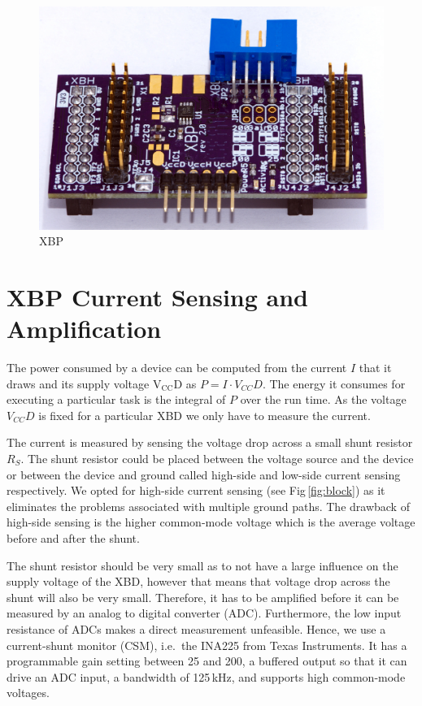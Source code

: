 \documentclass[twoside,11pt]{cergdoc}
\begin{document}
\begin{figure}[ht]
  \begin{center}
    \includegraphics[scale=0.8]{figures/xbp}
    \caption{XBP}\label{fig:xbp}
  \end{center}
\end{figure}

\section{XBP Current Sensing and Amplification}\label{sec:sensing}
The power consumed by a device can be computed from the current $I$ that it draws and
its supply voltage $\mathrm{V_{CC}D}$ as $P = I \cdot V_{CC}D$. The energy it 
consumes for executing a particular task is the integral of $P$ over the run time.
As the voltage $V_{CC}D$ is fixed for a particular XBD we only have to measure 
the current.

The current is measured by sensing the voltage drop across a small shunt resistor $R_S$.
The shunt resistor could be placed between the voltage source and the device
or between the device and ground called high-side and low-side current sensing
respectively. We opted for high-side current sensing (see Fig\,\ref{fig:block})
as it eliminates the problems associated with multiple ground paths. 
The drawback of high-side sensing is the higher common-mode voltage which is the
average voltage before and after the shunt. 


The shunt resistor should be very small as to not have a large influence on 
the supply voltage of the XBD, however that means that voltage drop across the shunt will
also be very small. Therefore, it has to be amplified before it can be measured by 
an analog to digital converter (ADC). Furthermore, the low input resistance
of ADCs makes a direct measurement unfeasible.  
Hence, we use a current-shunt monitor (CSM), i.e.\ the INA225 from Texas Instruments.
It has a programmable gain setting between 25 and 200, a buffered output so that it
can drive an ADC input, a bandwidth of 125\,kHz, and supports high common-mode voltages.
\end{document}
